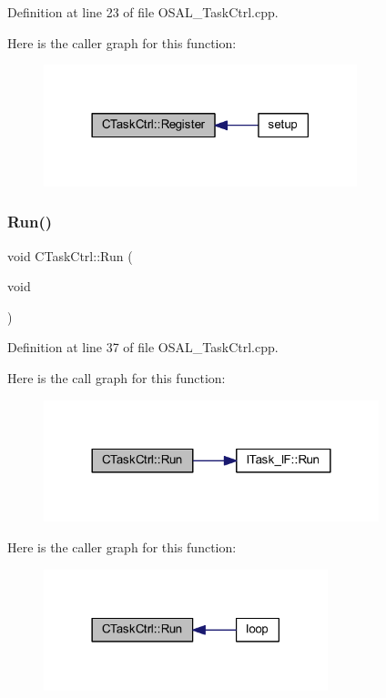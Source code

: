 Definition at line 23 of file O\+S\+A\+L\+\_\+\+Task\+Ctrl.\+cpp.

Here is the caller graph for this function\+:\nopagebreak
\begin{figure}[H]
\begin{center}
\leavevmode
\includegraphics[width=258pt]{class_c_task_ctrl_a20457bd4d4a033c8aeeb44e9d4dc3c7c_icgraph}
\end{center}
\end{figure}
\mbox{\label{class_c_task_ctrl_ab36ffef43b3bd33303ed7d068b2e89cf}} 
\subsubsection{\texorpdfstring{Run()}{Run()}}
{\footnotesize\ttfamily void C\+Task\+Ctrl\+::\+Run (\begin{DoxyParamCaption}\item[{void}]{ }\end{DoxyParamCaption})}



Definition at line 37 of file O\+S\+A\+L\+\_\+\+Task\+Ctrl.\+cpp.

Here is the call graph for this function\+:\nopagebreak
\begin{figure}[H]
\begin{center}
\leavevmode
\includegraphics[width=276pt]{class_c_task_ctrl_ab36ffef43b3bd33303ed7d068b2e89cf_cgraph}
\end{center}
\end{figure}
Here is the caller graph for this function\+:\nopagebreak
\begin{figure}[H]
\begin{center}
\leavevmode
\includegraphics[width=234pt]{class_c_task_ctrl_ab36ffef43b3bd33303ed7d068b2e89cf_icgraph}
\end{center}
\end{figure}


